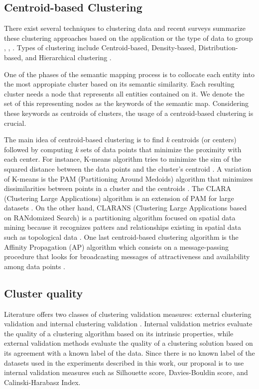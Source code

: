 \documentclass{ieeeaccess}
\begin{document}
\subsection{Centroid-based Clustering}

There exist several techniques to clustering data and recent surveys
summarize these clustering approaches based on the application or
the type of data to group \cite{Dongkuan2015}, 
\cite{DBLP:books/crc/aggarwal2013}, \cite{firdaus2015survey}. Types of
clustering include Centroid-based, Density-based, Distribution-based, and
Hierarchical clustering \cite{google_2022}.

One of the phases of the semantic mapping process is to collocate each entity
into the most appropiate cluster based on its semantic similarity. Each 
resulting cluster needs a node that represents all entities contained on it. We
denote the set of this representing nodes as the keywords of the semantic map. 
Considering these keywords as centroids of clusters, the usage of a centroid-based
clustering is crucial.

The main idea of centroid-based clustering is to find \textit{k}
centroids (or centers) followed by computing \textit{k} sets of data
points that minimize the proximity with each center. For instance, 
K-means algorithm tries to minimize the sim of the squared distance 
between the data points and the cluster's centroid \cite{macqueen1967classification}. 
A variation of K-means is the PAM (Partitioning Around Medoids) algorithm 
that minimizes dissimilarities between points in a cluster and the centroids 
\cite{kaufmanPAM}. The CLARA (Clustering Large Applications) algorithm is 
an extension of PAM for large datasets \cite{kaufmanCLARA}. On the 
other hand, CLARANS (Clustering Large Applications based on RANdomized 
Search) is a partitioning algorithm focused on spatial data mining 
because it recognizes patters and relationships existing in spatial 
data such as topological data \cite{ng2002clarans}. One last 
centroid-based clustering algorithm is the Affinity Propagation (AP) 
algorithm which consists on a message-passing procedure that looks 
for broadcasting messages of attractiveness and availability among 
data points \cite{frey2007clustering}.

\subsection{Cluster quality}

Literature offers two classes of clustering validation
measures: external  clustering validation and internal
clustering validation \cite{DBLP:books/crc/aggarwal2013}. 
Internal validation metrics evaluate the quality of a 
clustering algorithm based on its intrinsic 
properties, while external validation methods evaluate
the quality of a clustering solution based on its agreement
with a known label of the data. Since there is no known
label of the datasets used in the experiments described
in this work, our proposal is to use internal validation
measures such as Silhouette score, Davies-Bouldin score, 
and Calinski-Harabasz Index.
\end{document}
